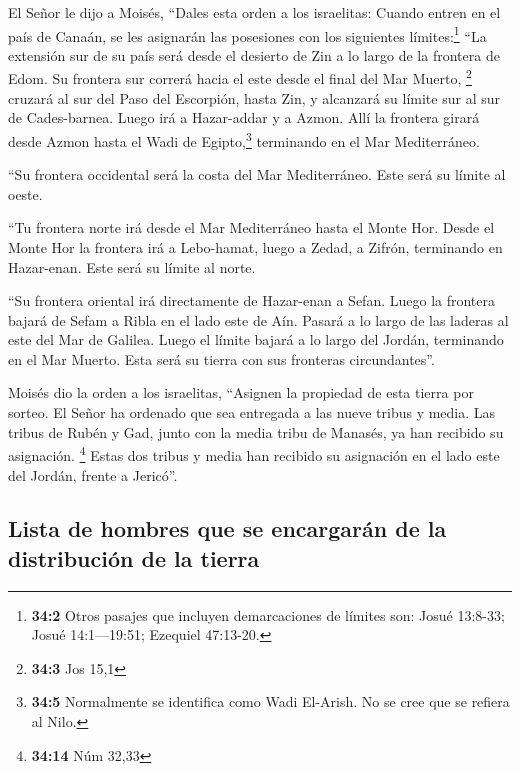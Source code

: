  El Señor le dijo a Moisés,  ``Dales esta
orden a los israelitas: Cuando entren en el país de Canaán, se les
asignarán las posesiones con los siguientes límites:\footnote{\textbf{34:2}
  Otros pasajes que incluyen demarcaciones de límites son: Josué
  13:8-33; Josué 14:1---19:51; Ezequiel 47:13-20.}  ``La
extensión sur de su país será desde el desierto de Zin a lo largo de la
frontera de Edom. Su frontera sur correrá hacia el este desde el final
del Mar Muerto, \footnote{\textbf{34:3} Jos 15,1}  cruzará
al sur del Paso del Escorpión, hasta Zin, y alcanzará su límite sur al
sur de Cades-barnea. Luego irá a Hazar-addar y a Azmon. 
Allí la frontera girará desde Azmon hasta el Wadi de Egipto,\footnote{\textbf{34:5}
  Normalmente se identifica como Wadi El-Arish. No se cree que se
  refiera al Nilo.} terminando en el Mar Mediterráneo.

 ``Su frontera occidental será la costa del Mar
Mediterráneo. Este será su límite al oeste.

 ``Tu frontera norte irá desde el Mar Mediterráneo hasta
el Monte Hor.  Desde el Monte Hor la frontera irá a
Lebo-hamat, luego a Zedad,  a Zifrón, terminando en
Hazar-enan. Este será su límite al norte.

 ``Su frontera oriental irá directamente de Hazar-enan a
Sefan.  Luego la frontera bajará de Sefam a Ribla en el
lado este de Aín. Pasará a lo largo de las laderas al este del Mar de
Galilea.  Luego el límite bajará a lo largo del Jordán,
terminando en el Mar Muerto. Esta será su tierra con sus fronteras
circundantes''.

 Moisés dio la orden a los israelitas, ``Asignen la
propiedad de esta tierra por sorteo. El Señor ha ordenado que sea
entregada a las nueve tribus y media.  Las tribus de
Rubén y Gad, junto con la media tribu de Manasés, ya han recibido su
asignación. \footnote{\textbf{34:14} Núm 32,33}  Estas
dos tribus y media han recibido su asignación en el lado este del
Jordán, frente a Jericó''.

\hypertarget{lista-de-hombres-que-se-encargaruxe1n-de-la-distribuciuxf3n-de-la-tierra}{%
\subsection{Lista de hombres que se encargarán de la distribución de la
tierra}\label{lista-de-hombres-que-se-encargaruxe1n-de-la-distribuciuxf3n-de-la-tierra}}

